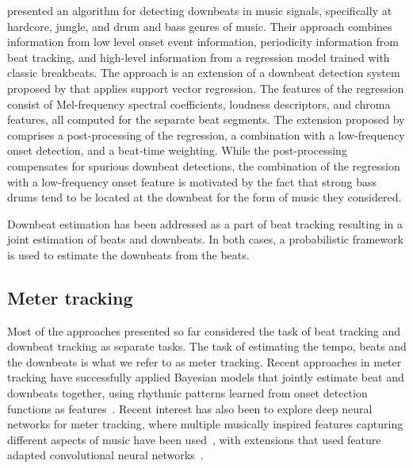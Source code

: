  presented an algorithm for detecting downbeats in music signals, specifically at hardcore, jungle, and drum and bass genres of music. Their approach combines information from low level onset event information, periodicity information from beat tracking, and high-level information from a regression model trained with classic breakbeats. The approach is an extension of a downbeat detection system proposed by  that applies support vector regression. The features of the regression consist of Mel-frequency spectral coefficients, loudness descriptors, and chroma features, all computed for the separate beat segments. The extension proposed by \citeauthor{hockman:12:downbeat} comprises a post-processing of the regression, a combination with a low-frequency onset detection, and a beat-time weighting. While the post-processing compensates for spurious downbeat detections, the combination of the regression with a low-frequency onset feature is motivated by the fact that strong bass drums tend to be located at the downbeat for the form of music they considered.

Downbeat estimation has been addressed as a part of beat tracking \cite{klapuri:06:meter,peeters:11:beat} resulting in a joint estimation of beats and downbeats. In both cases, a probabilistic framework is used to estimate the downbeats from the beats.
%
\subsection{Meter tracking}\label{sec:bkgnd:mt}
Most of the approaches presented so far considered the task of beat tracking and downbeat tracking as separate tasks. The task of estimating the tempo, beats and the downbeats is what we refer to as meter tracking. Recent approaches in meter tracking have successfully applied Bayesian models that jointly estimate beat and downbeats together, using rhythmic patterns learned from onset detection functions as features~\cite{krebs:13:bpm,bock:14:multimodel,krebs:15:pf}. Recent interest has also been to explore deep neural networks for meter tracking, where multiple musically inspired features capturing different aspects of music have been used~\cite{durand:15:dbtrack}, with extensions that used feature adapted convolutional neural networks~\cite{durand:16:feature}. 
